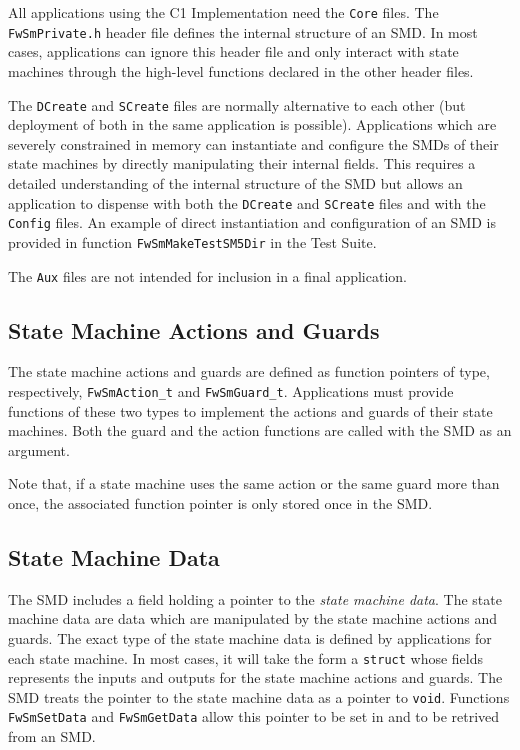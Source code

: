 \documentclass[manual]{../fwprofile}
\begin{document}
All applications using the C1 Implementation need the \texttt{Core} files. The \texttt{FwSmPrivate.h} header 
file defines the internal structure of an SMD. In most cases, applications can ignore this header file 
and only interact with state machines through the high-level functions declared in the other header files.

\newpage

The \texttt{DCreate} and \texttt{SCreate} files are normally alternative to each other (but deployment of 
both in the same application is possible). Applications which are severely constrained in memory can instantiate 
and configure the SMDs of their state machines by directly manipulating their internal fields. This requires a 
detailed understanding of the internal structure of the SMD but allows an application to dispense with both 
the \texttt{DCreate} and \texttt{SCreate} files and with the \texttt{Config} files. An example of direct instantiation 
and configuration of an SMD is provided in function \texttt{FwSmMakeTestSM5Dir} in the Test Suite. 

 

The \texttt{Aux} files are not intended for inclusion in a final application.

\subsection{State Machine Actions and Guards}
The state machine actions and guards are defined as function pointers of type, respectively, \texttt{FwSmAction\_t} 
and \texttt{FwSmGuard\_t}. Applications must provide functions of these two types to implement the actions and 
guards of their state machines. Both the guard and the action functions are called with the SMD as an argument.

 

Note that, if a state machine uses the same action or the same guard more than once, the associated function 
pointer is only stored once in the SMD. 

\subsection{State Machine Data}\label{sec:smData}
The SMD includes a field holding a pointer to the \emph{state machine data}. The state machine data are data 
which are manipulated by the state machine actions and guards. The exact type of the state machine data is 
defined by applications for each state machine. In most cases, it will take the form a \texttt{struct} whose 
fields represents the inputs and outputs for the state machine actions and guards. The SMD treats the pointer 
to the state machine data as a pointer to \texttt{void}. Functions \texttt{FwSmSetData} and \texttt{FwSmGetData} 
allow this pointer to be set in and to be retrived from an SMD.
\end{document}
